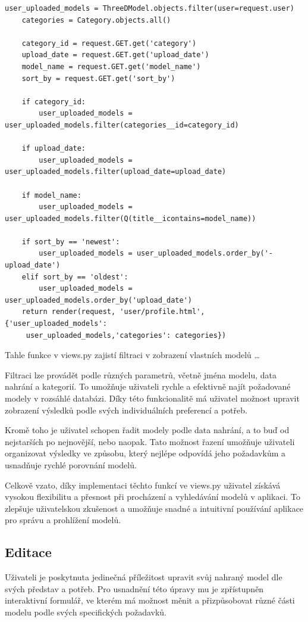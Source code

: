 \documentclass[12pt, a4paper,
twoside,        %
openright
]{report}
\begin{document}
\begin{lstlisting}
user_uploaded_models = ThreeDModel.objects.filter(user=request.user)
    categories = Category.objects.all()
    
    category_id = request.GET.get('category')
    upload_date = request.GET.get('upload_date')
    model_name = request.GET.get('model_name')
    sort_by = request.GET.get('sort_by')
   
    if category_id:
        user_uploaded_models = user_uploaded_models.filter(categories__id=category_id)
    
    if upload_date:
        user_uploaded_models = user_uploaded_models.filter(upload_date=upload_date)
   
    if model_name:
        user_uploaded_models = user_uploaded_models.filter(Q(title__icontains=model_name))
   
    if sort_by == 'newest':
        user_uploaded_models = user_uploaded_models.order_by('-upload_date')
    elif sort_by == 'oldest':
        user_uploaded_models = user_uploaded_models.order_by('upload_date')
    return render(request, 'user/profile.html', {'user_uploaded_models':
     user_uploaded_models,'categories': categories})
\end{lstlisting}
Tahle funkce v views.py zajistí filtraci v zobrazení vlastních modelů \dots



Filtraci lze provádět podle různých parametrů, včetně jména modelu, data nahrání a kategorií. To umožňuje uživateli rychle a efektivně najít požadované modely v rozsáhlé databázi. Díky této funkcionalitě má uživatel možnost upravit zobrazení výsledků podle svých individuálních preferencí a potřeb.

Kromě toho je uživatel schopen řadit modely podle data nahrání, a to buď od nejstarších po nejnovější, nebo naopak. Tato možnost řazení umožňuje uživateli organizovat výsledky ve způsobu, který nejlépe odpovídá jeho požadavkům a usnadňuje rychlé porovnání modelů.

Celkově vzato, díky implementaci těchto funkcí ve views.py uživatel získává vysokou flexibilitu a přesnost při procházení a vyhledávání modelů v aplikaci. To zlepšuje uživatelskou zkušenost a umožňuje snadné a intuitivní používání aplikace pro správu a prohlížení modelů.
		
		\subsection[Editace]{Editace}
		Uživateli je poskytnuta jedinečná příležitost upravit svůj nahraný model dle svých představ a potřeb. Pro usnadnění této úpravy mu je zpřístupněn interaktivní formulář, ve kterém má možnost měnit a přizpůsobovat různé části modelu podle svých specifických požadavků.
\end{document}
